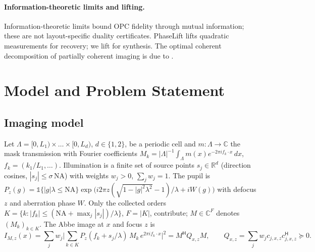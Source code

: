 \documentclass[11pt,a4paper]{article}
\newcommand{\R}{\mathbb{R}}\newcommand{\C}{\mathbb{C}}\newcommand{\PSD}{\succeq 0}
\newcommand{\I}{I}\newcommand{\rhostar}{\rho^{\star}}
\newcommand{\NA}{\mathrm{NA}}
\begin{document}
\paragraph{Information-theoretic limits and lifting.} Information-theoretic limits \cite{ma2017,wang2018} bound OPC fidelity through mutual information; these are not layout-specific duality certificates. PhaseLift \cite{candes2013} lifts quadratic measurements for recovery; we lift for synthesis. The optimal coherent decomposition of partially coherent imaging is due to \cite{pati1994}.

\section{Model and Problem Statement}\label{sec:model}
\subsection{Imaging model}
Let $\Lambda=[0,L_1)\times\dots\times[0,L_d)$, $d\in\{1,2\}$, be a periodic cell and $m:\Lambda\to\C$ the mask transmission with Fourier coefficients $M_k=|\Lambda|^{-1}\int_\Lambda m(x)e^{-2\pi i f_k\cdot x}\,dx$, $f_k=(k_1/L_1,\dots)$. Illumination is a finite set of source points $s_j\in\R^d$ (direction cosines, $|s_j|\le\sigma\,\NA$) with weights $w_j>0$, $\sum_j w_j=1$. The pupil is $P_z(g)=\mathbb{1}\{|g|\lambda\le\NA\}\exp\big(i2\pi z(\sqrt{1-|g|^2\lambda^2}-1)/\lambda + iW(g)\big)$ with defocus $z$ and aberration phase $W$. Only the collected orders $K=\{k:|f_k|\le(\NA+\max_j|s_j|)/\lambda\}$, $F=|K|$, contribute; $M\in\C^F$ denotes $(M_k)_{k\in K}$. The Abbe image at $x$ and focus $z$ is
\begin{equation}\label{eq:image}
\I_{M,z}(x)=\sum_{j} w_j\Big|\sum_{k\in K}P_z(f_k+s_j/\lambda)\,M_k\,e^{2\pi i f_k\cdot x}\Big|^2 = M^{\mathsf H}Q_{x,z}M,\qquad Q_{x,z}=\sum_j w_j c_{j,x,z}c_{j,x,z}^{\mathsf H}\PSD .
\end{equation}
\end{document}
